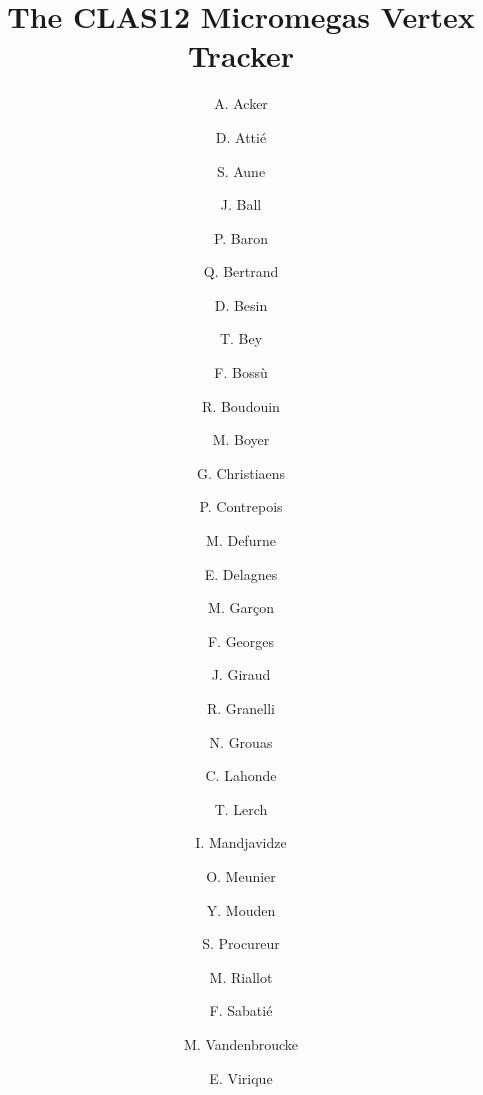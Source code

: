 \title{The CLAS12 Micromegas Vertex Tracker}

\author{A. Acker} 
\author{D. Atti\'e}
\author{S. Aune}
\author{J. Ball}
\author{P. Baron}
\author{Q. Bertrand}
\author{D. Besin}
\author{T. Bey}
\author{F. Boss\`u}
\author{R. Boudouin}
\author{M. Boyer}
\author{G. Christiaens}
\author{P. Contrepois}
\author{M. Defurne}
\author{E. Delagnes}
\author{M. Gar\c con}
\author{F. Georges}
\author{J. Giraud}
\author{R. Granelli}
\author{N. Grouas}
\author{C. Lahonde}
\author{T. Lerch}
\author{I. Mandjavidze}
\author{O. Meunier}
\author{Y. Mouden}
\author{S. Procureur}
\author{M. Riallot}
\author{F. Sabati\'e}
\author{M. Vandenbroucke}
\author{E. Virique}

\address{IRFU, CEA, Universit\'{e} Paris-Saclay, 91191, Gif-sur-Yvette, France}
